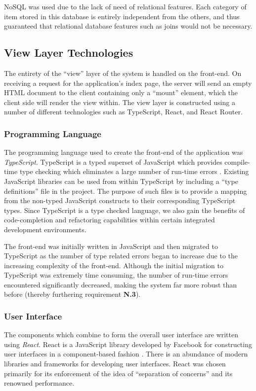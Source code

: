 \documentclass{l4proj}
\begin{document}
         NoSQL was used due to the lack of need of relational features. Each category of item stored in this database is entirely independent from the others, and thus guaranteed that relational database features such as joins would not be necessary.

    \subsection{View Layer Technologies}
    
    The entirety of the ``view'' layer of the system is handled on the front-end. On receiving a request for the application's index page, the server will send an empty HTML document to the client containing only a ``mount'' element, which the client side will render the view within. The view layer is constructed using a number of different technologies such as TypeScript, React, and React Router.
    
    \subsubsection{Programming Language}
        The programming language used to create the front-end of the application was \textit{TypeScript}. TypeScript is a typed superset of JavaScript which provides compile-time type checking which eliminates a large number of run-time errors \cite{typescript}. Existing JavaScript libraries can be used from within TypeScript by including a ``type definitions'' file in the project. The purpose of such files is to provide a mapping from the non-typed JavaScript constructs to their corresponding TypeScript types. Since TypeScript is a type checked language, we also gain the benefits of code-completion and refactoring capabilities within certain integrated development environments.
        
        The front-end was initially written in JavaScript and then migrated to TypeScript as the number of type related errors began to increase due to the increasing complexity of the front-end. Although the initial migration to TypeScript was extremely time consuming, the number of run-time errors encountered significantly decreased, making the system far more robust than before (thereby furthering requirement \textbf{N.3}).
    
        \subsubsection{User Interface}
        The components which combine to form the overall user interface are written using \textit{React}. React is a JavaScript library developed by Facebook for constructing user interfaces in a component-based fashion \cite{react}. There is an abundance of modern libraries and frameworks for developing user interfaces. React was chosen primarily for its enforcement of the idea of ``separation of concerns'' and its renowned performance.
        
\end{document}
